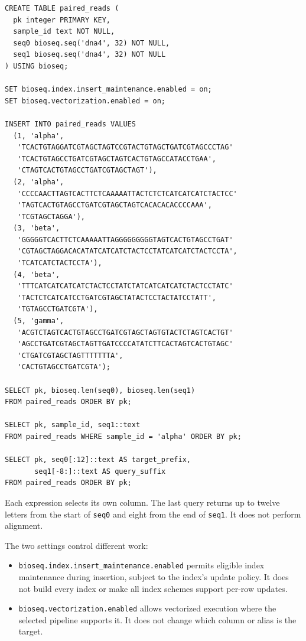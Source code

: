 \par\noindent\begin{minipage}{\linewidth}
\begin{lstlisting}[style=bioseq-appendix-sql]
CREATE TABLE paired_reads (
  pk integer PRIMARY KEY,
  sample_id text NOT NULL,
  seq0 bioseq.seq('dna4', 32) NOT NULL,
  seq1 bioseq.seq('dna4', 32) NOT NULL
) USING bioseq;

SET bioseq.index.insert_maintenance.enabled = on;
SET bioseq.vectorization.enabled = on;

INSERT INTO paired_reads VALUES
  (1, 'alpha',
   'TCACTGTAGGATCGTAGCTAGTCCGTACTGTAGCTGATCGTAGCCCTAG'
   'TCACTGTAGCCTGATCGTAGCTAGTCACTGTAGCCATACCTGAA',
   'CTAGTCACTGTAGCCTGATCGTAGCTAGT'),
  (2, 'alpha',
   'CCCCAACTTAGTCACTTCTCAAAAATTACTCTCTCATCATCATCTACTCC'
   'TAGTCACTGTAGCCTGATCGTAGCTAGTCACACACACCCCAAA',
   'TCGTAGCTAGGA'),
  (3, 'beta',
   'GGGGGTCACTTCTCAAAAATTAGGGGGGGGGTAGTCACTGTAGCCTGAT'
   'CGTAGCTAGGACACATATCATCATCTACTCCTATCATCATCTACTCCTA',
   'TCATCATCTACTCCTA'),
  (4, 'beta',
   'TTTCATCATCATCATCTACTCCTATCTATCATCATCATCTACTCCTATC'
   'TACTCTCATCATCCTGATCGTAGCTATACTCCTACTATCCTATT',
   'TGTAGCCTGATCGTA'),
  (5, 'gamma',
   'ACGTCTAGTCACTGTAGCCTGATCGTAGCTAGTGTACTCTAGTCACTGT'
   'AGCCTGATCGTAGCTAGTTGATCCCCATATCTTCACTAGTCACTGTAGC'
   'CTGATCGTAGCTAGTTTTTTTA',
   'CACTGTAGCCTGATCGTA');

SELECT pk, bioseq.len(seq0), bioseq.len(seq1)
FROM paired_reads ORDER BY pk;

SELECT pk, sample_id, seq1::text
FROM paired_reads WHERE sample_id = 'alpha' ORDER BY pk;

SELECT pk, seq0[:12]::text AS target_prefix,
       seq1[-8:]::text AS query_suffix
FROM paired_reads ORDER BY pk;
\end{lstlisting}
\end{minipage}

Each expression selects its own column. The last query returns up to twelve
letters from the start of \texttt{seq0} and eight from the end of
\texttt{seq1}. It does not perform alignment.

The two settings control different work:

\begin{itemize}
  \item \texttt{bioseq.index.insert\_maintenance.enabled} permits eligible
    index maintenance during insertion, subject to the index's update
    policy. It does not build every index or make all index schemes support
    per-row updates.
  \item \texttt{bioseq.vectorization.enabled} allows vectorized execution
    where the selected pipeline supports it. It does not change which
    column or alias is the target.
\end{itemize}

